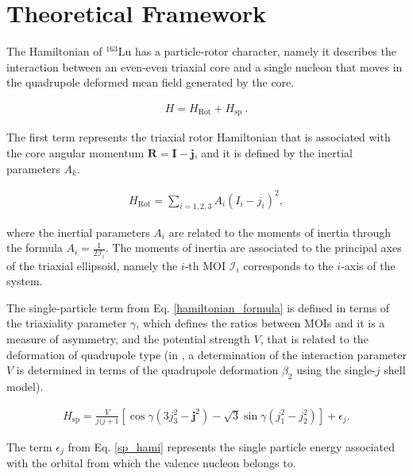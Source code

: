\documentclass[%
 reprint,
 amsmath,
 amssymb,
 aps,
 floatfix,
]{revtex4-2}
\begin{document}
\section{Theoretical Framework}

The Hamiltonian of $^{163}$Lu has a particle-rotor character, namely it describes the interaction between an even-even triaxial core and a single nucleon that moves in the quadrupole deformed mean field generated by the core.

\begin{align}
    H=H_\text{Rot}+H_\text{sp}\ . \label{hamiltonian_formula}
\end{align}

The first term represents the triaxial rotor Hamiltonian that is associated with the core angular momentum $\mathbf{R}=\mathbf{I}-\mathbf{j}$, and it is defined by the inertial parameters $A_k$.

\begin{align}
    H_\text{Rot}=\sum_{i=1,2,3}A_i\left(I_i-j_i\right)^2,
\end{align}
 
 where the inertial parameters $A_i$ are related to the moments of inertia through the formula $A_i=\frac{1}{2\mathcal{I}_i}$. The moments of inertia are associated to the principal axes of the triaxial ellipsoid, namely the $i$-th MOI $\mathcal{I}_i$ corresponds to the $i$-axis of the system.

The single-particle term from Eq. \ref{hamiltonian_formula} is defined in terms of the triaxiality parameter $\gamma$, which defines the ratios between MOIs and it is a measure of asymmetry, and the potential strength $V$, that is related to the deformation of quadrupole type (in \cite{shou2009coupling}, a determination of the interaction parameter $V$ is determined in terms of the quadrupole deformation $\beta_2$ using the single-$j$ shell model).

\begin{align}
    H_\text{sp} = \frac{V}{j(j+1}\left[\cos\gamma\left(3j_3^2-\mathbf{j}^2\right)-\sqrt{3}\sin\gamma\left(j_1^2-j_2^2\right)\right]+\epsilon_j. \label{sp_hami}
\end{align}

The term $\epsilon_j$ from Eq. \ref{sp_hami} represents the single particle energy associated with the orbital from which the valence nucleon belongs to.
\end{document}
